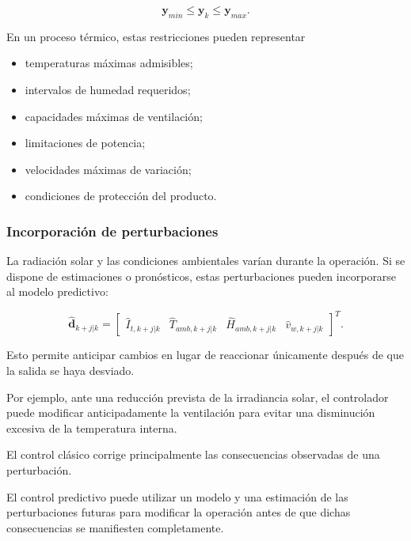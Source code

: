 \begin{equation}
\mathbf{y}_{min}
\leq
\mathbf{y}_k
\leq
\mathbf{y}_{max}.
\end{equation}

En un proceso térmico, estas restricciones pueden representar

\begin{itemize}
    \item temperaturas máximas admisibles;
    \item intervalos de humedad requeridos;
    \item capacidades máximas de ventilación;
    \item limitaciones de potencia;
    \item velocidades máximas de variación;
    \item condiciones de protección del producto.
\end{itemize}

\subsubsection{Incorporación de perturbaciones}

La radiación solar y las condiciones ambientales varían durante la operación. Si se dispone de estimaciones o pronósticos, estas perturbaciones pueden incorporarse al modelo predictivo:

\begin{equation}
\hat{\mathbf{d}}_{k+j|k}
=
\begin{bmatrix}
\hat{I}_{t,k+j|k} &
\hat{T}_{amb,k+j|k} &
\hat{H}_{amb,k+j|k} &
\hat{v}_{w,k+j|k}
\end{bmatrix}^{T}.
\end{equation}

Esto permite anticipar cambios en lugar de reaccionar únicamente después de que la salida se haya desviado.

Por ejemplo, ante una reducción prevista de la irradiancia solar, el controlador puede modificar anticipadamente la ventilación para evitar una disminución excesiva de la temperatura interna.

\begin{tcolorbox}[
title=Carácter anticipativo del MPC,
colback=green!4,
colframe=green!55!black
]
El control clásico corrige principalmente las consecuencias observadas de una perturbación.

El control predictivo puede utilizar un modelo y una estimación de las perturbaciones futuras para modificar la operación antes de que dichas consecuencias se manifiesten completamente.
\end{tcolorbox}

